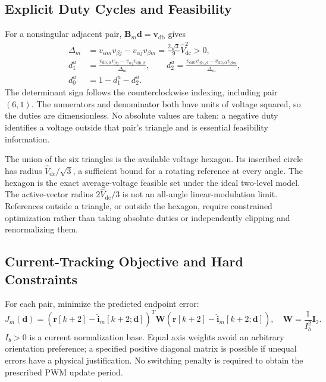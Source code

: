 \subsection{Explicit Duty Cycles and Feasibility}
For a nonsingular adjacent pair, $\mathbf B_m\mathbf d=\mathbf v_{\mathrm{db}}$ gives
\begin{align}
\Delta_m&=v_{\alpha m}v_{\beta j}-v_{\alpha j}v_{\beta m}
=\frac{2\sqrt3}{9}\widehat V_{\mathrm{dc}}^2>0,\label{eq:ch5-pair-determinant}\\
d_1^{u}&=\frac{v_{\mathrm{db},\alpha}v_{\beta j}-v_{\alpha j}v_{\mathrm{db},\beta}}{\Delta_m},\qquad
 d_2^{u}=\frac{v_{\alpha m}v_{\mathrm{db},\beta}-v_{\mathrm{db},\alpha}v_{\beta m}}{\Delta_m},\label{eq:ch5-unconstrained-duties}\\
d_0^{u}&=1-d_1^{u}-d_2^{u}.\label{eq:ch5-zero-duty}
\end{align}
The determinant sign follows the counterclockwise indexing, including pair $(6,1)$. The numerators and denominator both have units of voltage squared, so the duties are dimensionless. No absolute values are taken: a negative duty identifies a voltage outside that pair's triangle and is essential feasibility information.

The union of the six triangles is the available voltage hexagon. Its inscribed circle has radius $\widehat V_{\mathrm{dc}}/\sqrt3$, a sufficient bound for a rotating reference at every angle. The hexagon is the exact average-voltage feasible set under the ideal two-level model. The active-vector radius $2\widehat V_{\mathrm{dc}}/3$ is not an all-angle linear-modulation limit. References outside a triangle, or outside the hexagon, require constrained optimization rather than taking absolute duties or independently clipping and renormalizing them.

\subsection{Current-Tracking Objective and Hard Constraints}
For each pair, minimize the predicted endpoint error:
\begin{equation}
J_m(\mathbf d)=
\left(\mathbf r[k+2]-\widehat{\mathbf i}_m[k+2;\mathbf d]\right)^T
\mathbf W
\left(\mathbf r[k+2]-\widehat{\mathbf i}_m[k+2;\mathbf d]\right),
\quad \mathbf W=\frac{1}{I_b^2}\mathbf I_2.
\label{eq:ch5-cost}
\end{equation}
$I_b>0$ is a current normalization base. Equal axis weights avoid an arbitrary orientation preference; a specified positive diagonal matrix is possible if unequal errors have a physical justification. No switching penalty is required to obtain the prescribed PWM update period.

